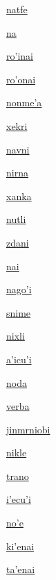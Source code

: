 {\hyperlink{val:natfe}{natfe}}{}{}{}

{\hyperlink{val:na}{na}}{}{}{}

{\hyperlink{val:rohinai}{ro'inai}}{}{}{}

{\hyperlink{val:rohonai}{ro'onai}}{}{}{}

{\hyperlink{val:nonmeha}{nonme'a}}{}{}{}

{\hyperlink{val:xekri}{xekri}}{}{}{}

{\hyperlink{val:navni}{navni}}{}{}{}

{\hyperlink{val:nirna}{nirna}}{}{}{}

{\hyperlink{val:xanka}{xanka}}{}{}{}

{\hyperlink{val:nutli}{nutli}}{}{}{}

{\hyperlink{val:zdani}{zdani}}{}{}{}

{\hyperlink{val:nai}{nai}}{}{}{}

{\hyperlink{val:nagohi}{nago'i}}{}{}{}

{\hyperlink{val:snime}{snime}}{}{}{}

{\hyperlink{val:nixli}{nixli}}{}{}{}

{\hyperlink{val:ahicuhi}{a'icu'i}}{}{}{}

{\hyperlink{val:noda}{noda}}{}{}{}

{\hyperlink{val:verba}{verba}}{}{}{}

{\hyperlink{val:jinmrniobi}{jinmrniobi}}{}{}{}

{\hyperlink{val:nikle}{nikle}}{}{}{}

{\hyperlink{val:trano}{trano}}{}{}{}

{\hyperlink{val:ihecuhi}{i'ecu'i}}{}{}{}

{\hyperlink{val:nohe}{no'e}}{}{}{}

{\hyperlink{val:kihenai}{ki'enai}}{}{}{}

{\hyperlink{val:tahenai}{ta'enai}}{}{}{}

